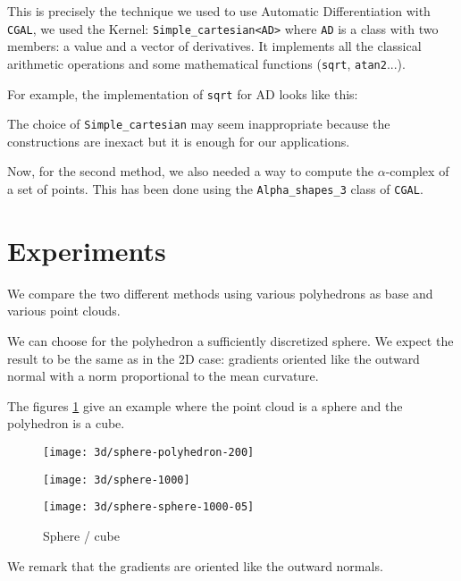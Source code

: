 This is precisely the technique we used to use Automatic Differentiation with
\texttt{CGAL}, we used the Kernel: \texttt{Simple\_cartesian<AD>} where
\texttt{AD} is a class with two members: a value and a vector of derivatives.
It implements all the classical arithmetic operations and some mathematical
functions (\texttt{sqrt}, \texttt{atan2}...).

For example, the implementation of \texttt{sqrt} for AD looks like this:


The choice of \texttt{Simple\_cartesian} may seem inappropriate because the
constructions are inexact but it is enough for our applications.

Now, for the second method, we also needed a way to compute the $\alpha$-complex
of a set of points. This has been done using the \texttt{Alpha\_shapes\_3} class
of \texttt{CGAL}.


\section{Experiments}


We compare the two different methods using various polyhedrons as base and
various point clouds.

We can choose for the polyhedron a sufficiently discretized sphere. We expect
the result to be the same as in the 2D case: gradients oriented like the outward
normal with a norm proportional to the mean curvature.

The figures \ref{fig:3d-mean-curvature-sphere-cube} give an example where the
point cloud is a sphere and the polyhedron is a cube.

\begin{figure}[h]
    \centering
    \begin{minipage}{0.32\linewidth}
        \centering
        \texttt{[image: 3d/sphere-polyhedron-200]}
    \end{minipage}
    \begin{minipage}{0.32\linewidth}
        \centering
        \texttt{[image: 3d/sphere-1000]}
    \end{minipage}
    \begin{minipage}{0.32\linewidth}
        \centering
        \texttt{[image: 3d/sphere-sphere-1000-05]}
    \end{minipage}
    \caption{Sphere / cube}
    \label{fig:3d-mean-curvature-sphere-cube}
\end{figure}
We remark that the gradients are oriented like the outward normals.

